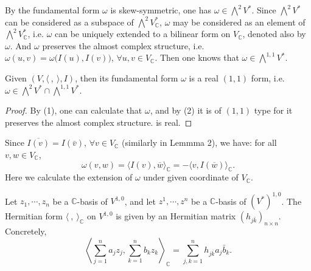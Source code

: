 \documentclass{ctexart}
\begin{document}
By the fundamental form $\omega$ is skew-symmetric, one has $\omega \in \bigwedge^{2} V^{*}$. Since $\bigwedge^{2} V^{*}$ can be considered as a subspace of $\bigwedge^{2} V^{*}_\mathbb{C}$, $\omega$ may be considered as 
an element of $\bigwedge^{2} V^{*}_\mathbb{C}$, i.e. $\omega$ can be uniquely extended to a bilinear form on $V_\mathbb{C}$, denoted also by $\omega$. 
And $\omega$ preserves the almost complex structure, i.e. $\omega(u,v)=\omega\bigl(I(u),I(v)\bigr)$, $\forall u,v\in V_\mathbb{C}$.
Then one knows that $\omega \in \bigwedge^{1,1} V^{*}$.  
\begin{proposition}
  Given $(V,\langle\ ,\ \rangle, I)$, then its fundamental form $\omega$ is a real $(1,1)$ form, 
  i.e. $\omega \in \bigwedge^{2} V^{*} \cap \bigwedge^{1,1} V^{*}$.
\end{proposition}
\begin{proof}[Proof]
  By (1), one can calculate that $\omega$, and by (2) it is of $(1,1)$ type for it preserves the almost complex structure. 
  is real. 
\end{proof}

Since $\overline{I(v)}=I(\bar{v})$, $\forall v\in V_{\mathbb{C}}$ (similarly in Lemmma 2), we have: for all $v,w\in V_{\mathbb{C}}$,
$$
\omega(v,w)=\langle I(v),\overline{w}\rangle_\mathbb{C}=-\langle v,I(\overline{w})\rangle_\mathbb{C}.
$$
Here we calculate the extension of $\omega$ under given coordinate of $V_\mathbb{C}$. 

Let $z_{1}, \cdots, z_{n}$ be a $\mathbb{C}$-basis of $V^{1,0}$, and let $z^{1}, \cdots, z^{n}$ be a $\mathbb{C}$-basis of $(V^*)^{1,0}$. 
The Hermitian form $\langle\ ,\ \rangle_{\mathbb{C}}$ on $V^{1,0}$ is given by an Hermitian matrix $\left(h_{j \bar{k}}\right)_{n\times n}$. Concretely, 
$$
\left\langle\sum_{j=1}^{n} a_{j} z_{j}, \sum_{k=1}^{n} b_{k} z_{k}\right\rangle_{\mathbb{C}}=\sum_{j, k=1}^{n} h_{j \bar{k}} a_{j} \bar{b}_{k} .
$$
\end{document}

